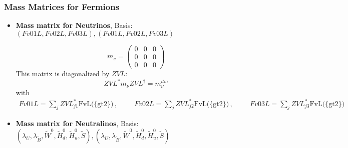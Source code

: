 \subsubsection{Mass Matrices for Fermions}
\begin{itemize} 
\item {\bf Mass matrix for Neutrinos}, Basis: \( \left(Fv01L, Fv02L, Fv03L\right), \left(Fv01L, Fv02L, Fv03L\right) \) 
 
\begin{equation} 
m_{\nu} = \left( 
\begin{array}{ccc}
0 &0 &0\\ 
0 &0 &0\\ 
0 &0 &0\end{array} 
\right) 
 \end{equation} 
This matrix is diagonalized by \(ZVL\): 
\begin{equation} 
ZVL^* m_{\nu} ZVL^{\dagger} = m^{dia}_{\nu} 
\end{equation} 
with 
\begin{align} 
Fv01L = \sum_{j}ZVL^*_{j 1}\text{FvL}\Big(\{\text{gt2}\}\Big)\,, \hspace{1cm} 
Fv02L = \sum_{j}ZVL^*_{j 2}\text{FvL}\Big(\{\text{gt2}\}\Big)\,, \hspace{1cm} 
Fv03L = \sum_{j}ZVL^*_{j 3}\text{FvL}\Big(\{\text{gt2}\}\Big)
\end{align} 
\item {\bf Mass matrix for Neutralinos}, Basis: \( \left(\lambda_U, \lambda_{\tilde{B}}, \tilde{W}^0, \tilde{H}_d^0, \tilde{H}_u^0, \tilde{S}\right), \left(\lambda_U, \lambda_{\tilde{B}}, \tilde{W}^0, \tilde{H}_d^0, \tilde{H}_u^0, \tilde{S}\right) \) 
 

\end{itemize}
